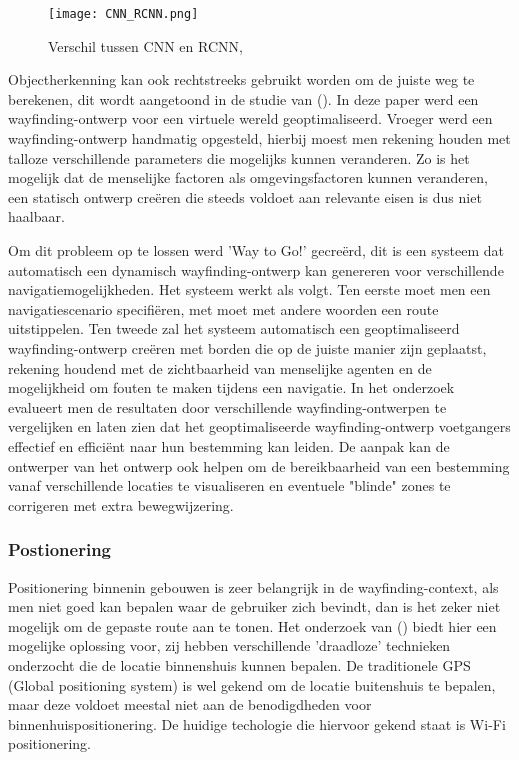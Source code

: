 \begin{figure}[H]
	\centering
	\texttt{[image: CNN\_RCNN.png]}
	\caption{Verschil tussen CNN en RCNN, \autocite{Liang2015}}
\end{figure}

Objectherkenning kan ook rechtstreeks gebruikt worden om de juiste weg te berekenen, dit wordt aangetoond in de studie van \textcite{Haikun2017} (). In deze paper werd een wayfinding-ontwerp voor een virtuele wereld geoptimaliseerd. Vroeger werd een wayfinding-ontwerp handmatig opgesteld, hierbij moest men rekening houden met talloze verschillende parameters die mogelijks kunnen veranderen. Zo is het mogelijk dat de menselijke factoren als omgevingsfactoren  kunnen veranderen, een statisch ontwerp creëren die steeds voldoet aan relevante eisen is dus niet haalbaar.

Om dit probleem op te lossen werd 'Way to Go!' gecreërd, dit is een systeem dat automatisch een dynamisch wayfinding-ontwerp kan genereren voor verschillende navigatiemogelijkheden. Het systeem werkt als volgt. Ten eerste moet men een navigatiescenario specifiëren, met moet met andere woorden een route uitstippelen. Ten tweede zal het systeem automatisch een geoptimaliseerd wayfinding-ontwerp creëren met borden die op de juiste manier zijn geplaatst, rekening houdend met de zichtbaarheid van menselijke agenten en de mogelijkheid om fouten te maken tijdens een navigatie.  In het onderzoek evalueert men de resultaten door verschillende wayfinding-ontwerpen te vergelijken en laten zien dat het geoptimaliseerde wayfinding-ontwerp voetgangers effectief en efficiënt naar hun bestemming kan leiden. De aanpak kan de ontwerper van het ontwerp ook helpen om de bereikbaarheid van een bestemming vanaf verschillende locaties te visualiseren en eventuele "blinde" zones te corrigeren met extra bewegwijzering.

\subsubsection{Postionering}
Positionering binnenin gebouwen is zeer belangrijk in de wayfinding-context, als men niet goed kan bepalen waar de gebruiker zich bevindt, dan is het zeker niet mogelijk om de gepaste route aan te tonen. Het onderzoek van \textcite{Hasan2019} () biedt hier een mogelijke oplossing voor, zij hebben verschillende 'draadloze' technieken onderzocht die de locatie binnenshuis kunnen bepalen. De traditionele GPS (Global positioning system) is wel gekend om de locatie buitenshuis te bepalen, maar deze voldoet meestal niet aan de benodigdheden voor binnenhuispositionering. De huidige techologie die hiervoor gekend staat is Wi-Fi positionering.

